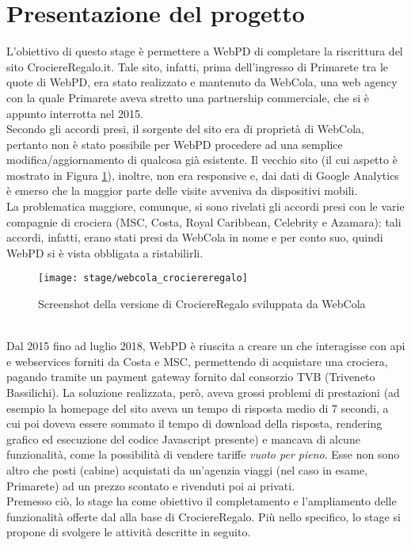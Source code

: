 \section{Presentazione del progetto}
L'obiettivo di questo stage è permettere a WebPD di completare la riscrittura del sito CrociereRegalo.it. Tale sito, infatti, prima dell'ingresso di Primarete tra le quote di WebPD, era stato realizzato e mantenuto da WebCola, una web agency con la quale Primarete aveva stretto una partnership commerciale, che si è appunto interrotta nel 2015.\\
Secondo gli accordi presi, il sorgente del sito era di proprietà di WebCola, pertanto non è stato possibile per WebPD procedere ad una semplice modifica/aggiornamento di qualcosa già esistente. Il vecchio sito (il cui aspetto è mostrato in Figura \ref{figura:vecchio-sito}), inoltre, non era responsive e, dai dati di Google Analytics è emerso che la maggior parte delle visite avveniva da dispositivi mobili. \\
La problematica maggiore, comunque, si sono rivelati gli accordi presi con le varie compagnie di crociera (MSC, Costa, Royal Caribbean, Celebrity e Azamara): tali accordi, infatti, erano stati presi da WebCola in nome e per conto suo, quindi WebPD si è vista obbligata a ristabilirli.
\begin{figure}[!h] 
	\centering 
	\texttt{[image: stage/webcola\_crociereregalo]} 
	\caption{Screenshot della versione di CrociereRegalo sviluppata da WebCola}
	\label{figura:vecchio-sito}
\end{figure}\\
Dal 2015 fino ad luglio 2018, WebPD è riuscita a creare un \bookingEngine\hphantom{i}che interagisse con \Gls{api} e \glspl{webservice} forniti da Costa e MSC, permettendo di acquistare una crociera, pagando tramite un payment gateway fornito dal consorzio TVB (Triveneto Bassilichi). La soluzione realizzata, però, aveva grossi problemi di prestazioni (ad esempio la homepage del sito aveva un tempo di risposta medio di 7 secondi, a cui poi doveva essere sommato il tempo di download della risposta, rendering grafico ed esecuzione del codice Javascript presente) e mancava di alcune funzionalità, come la possibilità di vendere tariffe \textit{vuoto per pieno}. Esse non sono altro che posti (cabine) acquistati da un'agenzia viaggi (nel caso in esame, Primarete) ad un prezzo scontato e rivenduti poi ai privati.
\\
Premesso ciò, lo stage ha come obiettivo il completamento e l'ampliamento delle funzionalità offerte dal \bookingEngine\hphantom{i}alla base di CrociereRegalo. Più nello specifico, lo stage si propone di svolgere le attività descritte in seguito.

